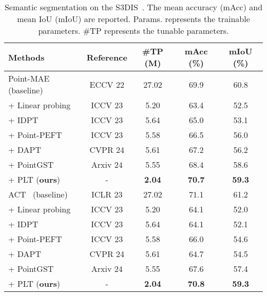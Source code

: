\begin{table}[t]
  \centering
  \scriptsize
  \setlength{\tabcolsep}{1.5mm}
  \caption{Semantic segmentation on the S3DIS~\cite{armeni20163d}. The
    mean accuracy (mAcc) and mean IoU (mIoU) are reported.
    Params. represents the trainable parameters. \#TP represents the tunable parameters.}
    \vspace{-10pt}
    \begin{tabular}{lcccc}
    \toprule
    Methods & Reference & \#TP (M)& mAcc (\%) & mIoU (\%) \\
    \midrule
    Point-MAE~\cite{pang2022masked} (baseline) &  ECCV 22 & 27.02 & 69.9 & 60.8 \\ 
    + Linear probing & ICCV 23 & 5.20  & 63.4  & 52.5  \\
    + IDPT~\cite{zha2023instance} & ICCV 23 & 5.64  & 65.0  & 53.1  \\
    + Point-PEFT~\cite{tang2024point} & ICCV 23 & 5.58  & 66.5  & 56.0  \\
    + DAPT~\cite{zhou2024dynamic} & CVPR 24 & 5.61  & 67.2 & 56.2 \\
    + PointGST~\cite{liang2024parameter} & Arxiv 24 & 5.55  & 68.4 & 58.6 \\
    \rowcolor{linecolor!40}+ PLT (\textbf{ours})& - & \textbf{2.04}  & \textbf{70.7} & \textbf{59.3} \\
    \midrule
    ACT~\cite{dong2022autoencoders} (baseline) &  ICLR 23 & 27.02 & 71.1 & 61.2 \\ 
    + Linear probing & ICCV 23 & 5.20  & 64.1  & 52.0  \\
    + IDPT~\cite{zha2023instance} & ICCV 23 & 5.64  & 64.1  & 52.1  \\
    + Point-PEFT~\cite{tang2024point} & ICCV 23 & 5.58  & 66.0  & 54.6  \\
    + DAPT~\cite{zhou2024dynamic} & CVPR 24 & 5.61  & 64.7 & 54.5 \\
    + PointGST~\cite{liang2024parameter} & Arxiv 24 & 5.55  & 67.6 & 57.4 \\
    \rowcolor{linecolor!40}+ PLT (\textbf{ours})& - & \textbf{2.04}  & \textbf{70.8} & \textbf{59.3} \\
    \bottomrule
    \end{tabular}
  \label{tab:semantic_segmentation}
\end{table}